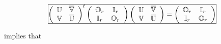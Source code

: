 \documentclass[aps, preprint]{revtex4}
\begin{document}
\begin{equation}\frame{$\left (\begin{array}{cc}\mathbb{U} & \overline{\mathbb{V}} \\
\mathbb{V} & \overline{\mathbb{U}}\end{array}\right )^{t} \left (\begin{array}{cc}\mathbb{O}_{r} & \mathbb{I}_{r} \\
\mathbb{I}_{r} & \mathbb{O}_{r}\end{array}\right ) \left (\begin{array}{cc}\mathbb{U} & \overline{\mathbb{V}} \\
\mathbb{V} & \overline{\mathbb{U}}\end{array}\right ) =\left (\begin{array}{cc}\mathbb{O}_{r} & \mathbb{I}_{r} \\
\mathbb{I}_{r} & \mathbb{O}_{r}\end{array}\right )$}
\end{equation}implies that
\end{document}
